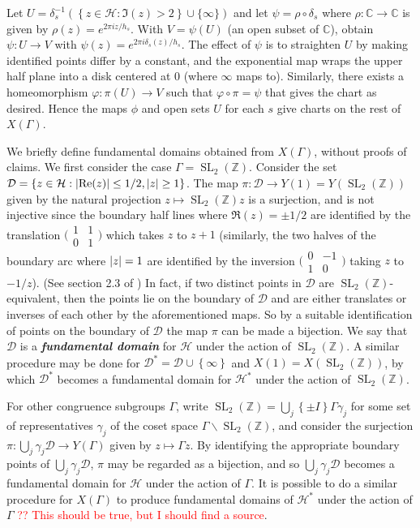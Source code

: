 \documentclass[10pt,leqno,twoside]{article}
\theoremstyle{plain}
\theoremstyle{definition}
\numberwithin{equation}{section}
\numberwithin{lem}{section}
\newcommand{\cbr}[1]{\left\{#1\right\}}
\newcommand{\textib}[1]{\textbf{\textit{#1\index{#1}}}} %
\DeclareMathOperator{\SL}{SL}
\newcommand{\slz}{\SL_2(\mathbb{Z})}
\newcommand{\sai}[1]{\textcolor{red}{#1}}
\begin{document}
Let $U = \delta_s^{-1}(\cbr{z\in\mathcal H : \Im(z) > 2}\cup\{\infty\})$ and let $\psi = \rho\circ \delta_s$ where $\rho\colon \mathbb C\to\mathbb C$ is given by $\rho(z) = e^{2\pi i z/h_s}$. With $V = \psi(U)$ (an open subset of $\mathbb C$), obtain $\psi\colon U\to V$ with $\psi(z) = e^{2\pi i \delta_s(z)/h_s}$. The effect of $\psi$ is to straighten $U$ by making identified points differ by a constant, and the exponential map wraps the upper half plane into a disk centered at $0$ (where $\infty$ maps to). Similarly, there exists a homeomorphism $\varphi\colon \pi(U)\to V$ such that $\varphi\circ\pi = \psi$ that gives the chart as desired. Hence the maps $\phi$ and open sets $U$ for each $s$ give charts on the rest of $X(\varGamma)$.

We briefly define fundamental domains obtained from $X(\varGamma)$, without proofs of claims. We first consider the case $\varGamma = \slz$. Consider the set $\mathcal D = \cbr{z\in\mathcal H : \abs{\Re(z)}\leq 1/2,\abs{z}\geq 1}$. The map $\pi\colon\mathcal D\to Y(1) = Y(\slz)$ given by the natural projection $z\mapsto \slz z$ is a surjection, and is not injective since the boundary half lines where $\Re(z) = \pm 1/2$ are identified by the translation $\big(\!\begin{smallmatrix}
    1 & 1 \\ 0 & 1
\end{smallmatrix}\!\big)$ which takes $z$ to $z+1$ (similarly, the two halves of the boundary arc where $\abs{z} = 1$ are identified by the inversion $\big(\!\begin{smallmatrix}
    0 & -1 \\ 1 & 0
\end{smallmatrix}\!\big)$ taking $z$ to $-1/z$). (See section 2.3 of \cite{diamond}) In fact, if two distinct points in $\mathcal D$ are $\slz$-equivalent, then the points lie on the boundary of $\mathcal D$ and are either translates or inverses of each other by the aforementioned maps. So by a suitable identification of points on the boundary of $\mathcal D$ the map $\pi$ can be made a bijection. We say that $\mathcal D$ is a \textib{fundamental domain} for $\mathcal H$ under the action of $\slz$. A similar procedure may be done for $\mathcal D^\ast = \mathcal D \cup\cbr{\infty}$ and $X(1) = X(\slz)$, by which $\mathcal D^\ast$ becomes a fundamental domain for $\mathcal H^\ast$ under the action of $\slz$. 

For other congruence subgroups $\varGamma$, write $\slz = \bigcup_j \cbr{\pm I}\varGamma \gamma_j$ for some set of representatives $\gamma_j$ of the coset space $\varGamma\backslash \slz$, and consider the surjection $\pi\colon \bigcup_j \gamma_j\mathcal D\to Y(\varGamma)$ given by $z\mapsto \varGamma z$. By identifying the appropriate boundary points of $\bigcup_j \gamma_j\mathcal D$, $\pi$ may be regarded as a bijection, and so $\bigcup_j \gamma_j\mathcal D$ becomes a fundamental domain for $\mathcal H$ under the action of $\varGamma$. It is possible to do a similar procedure for $X(\varGamma)$ to produce fundamental domains of $\mathcal H^\ast$ under the action of $\varGamma$ \sai{?? This should be true, but I should find a source}. 
\end{document}
